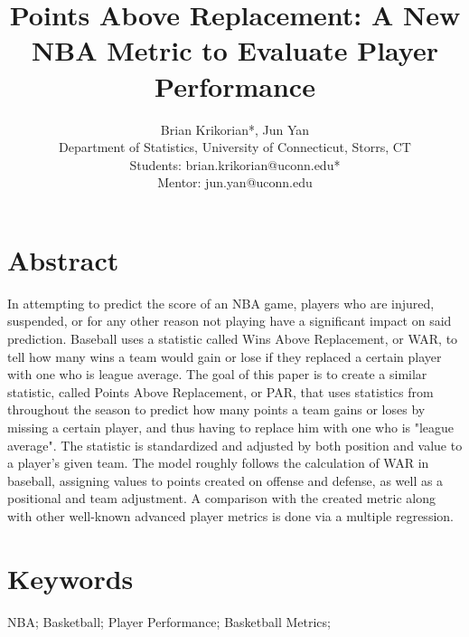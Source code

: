 \documentclass[12pt]{article}
\title{Points Above Replacement: A New NBA Metric to Evaluate Player Performance}
\author{
Brian Krikorian*, Jun Yan \\ \medskip 
Department of Statistics, University of Connecticut, Storrs, CT  \\  \medskip 
Students: brian.krikorian@uconn.edu* \\
Mentor: jun.yan@uconn.edu 
}
\begin{document}
\section*{Abstract}
In attempting to predict the score of an NBA game, players who are injured, suspended, or for any other 
reason not playing have a significant impact on said prediction. Baseball uses a statistic called Wins Above 
Replacement, or WAR, to tell how many wins a team would gain or lose if they replaced a certain player 
with one who is league average. The goal of this paper is to create a similar statistic, called Points Above 
Replacement, or PAR, that uses statistics from throughout the season to predict how many points a team 
gains or loses by missing a certain player, and thus having to replace him with one who is "league 
average". The statistic is standardized and adjusted by both position and value to a player's given team. 
The model roughly follows the calculation of WAR in baseball, assigning values to points created on offense 
and defense, as well as a positional and team adjustment. A comparison with the created metric along with 
other well-known advanced player metrics is done via a multiple regression.

\section*{Keywords} 
NBA; Basketball; Player Performance; Basketball Metrics;
\vspace{.12 in}
\end{document}
